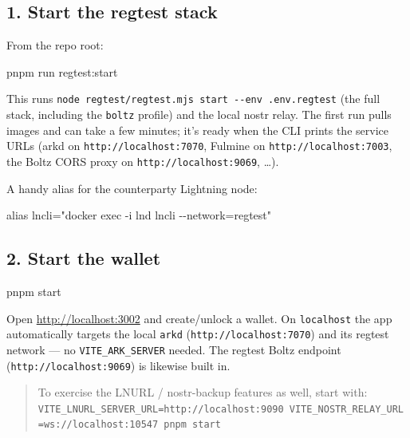 \documentclass[
]{article}
\newenvironment{Shaded}{}{}
\newcommand{\BuiltInTok}[1]{\textcolor[rgb]{0.00,0.50,0.00}{#1}}
\newcommand{\ExtensionTok}[1]{#1}
\newcommand{\NormalTok}[1]{#1}
\newcommand{\StringTok}[1]{\textcolor[rgb]{0.25,0.44,0.63}{#1}}
\begin{document}
\hypertarget{start-the-regtest-stack}{%
\subsection{1. Start the regtest stack}\label{start-the-regtest-stack}}

From the repo root:

\begin{Shaded}
\begin{Highlighting}[]
\ExtensionTok{pnpm}\NormalTok{ run regtest:start}
\end{Highlighting}
\end{Shaded}

This runs
\texttt{node\ regtest/regtest.mjs\ start\ -\/-env\ .env.regtest} (the
full stack, including the \texttt{boltz} profile) and the local nostr
relay. The first run pulls images and can take a few minutes; it's ready
when the CLI prints the service URLs (arkd on
\texttt{http://localhost:7070}, Fulmine on
\texttt{http://localhost:7003}, the Boltz CORS proxy on
\texttt{http://localhost:9069}, \ldots).

A handy alias for the counterparty Lightning node:

\begin{Shaded}
\begin{Highlighting}[]
\BuiltInTok{alias}\NormalTok{ lncli=}\StringTok{"docker exec {-}i lnd lncli {-}{-}network=regtest"}
\end{Highlighting}
\end{Shaded}

\hypertarget{start-the-wallet}{%
\subsection{2. Start the wallet}\label{start-the-wallet}}

\begin{Shaded}
\begin{Highlighting}[]
\ExtensionTok{pnpm}\NormalTok{ start}
\end{Highlighting}
\end{Shaded}

Open \url{http://localhost:3002} and create/unlock a wallet. On
\texttt{localhost} the app automatically targets the local \texttt{arkd}
(\texttt{http://localhost:7070}) and its regtest network --- no
\texttt{VITE\_ARK\_SERVER} needed. The regtest Boltz endpoint
(\texttt{http://localhost:9069}) is likewise built in.

\begin{quote}
To exercise the LNURL / nostr-backup features as well, start with:
\texttt{VITE\_LNURL\_SERVER\_URL=http://localhost:9090\ VITE\_NOSTR\_RELAY\_URL=ws://localhost:10547\ pnpm\ start}
\end{quote}
\end{document}
